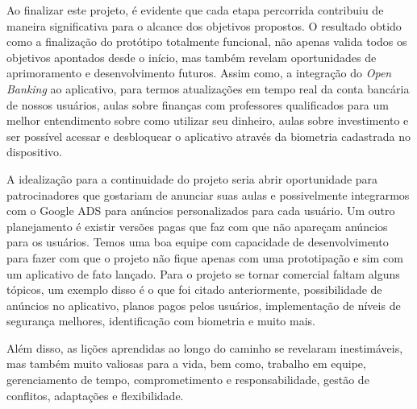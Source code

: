 Ao finalizar este projeto, é evidente que cada etapa percorrida contribuiu de maneira significativa para o alcance dos objetivos propostos. O resultado obtido como a finalização do protótipo totalmente funcional, não apenas valida todos os objetivos apontados desde o início, mas também revelam oportunidades de aprimoramento e desenvolvimento futuros. Assim como, a integração do \textit{Open Banking} ao aplicativo, para termos atualizações em tempo real da conta bancária de nossos usuários, aulas sobre finanças com professores qualificados para um melhor entendimento sobre como utilizar seu dinheiro, aulas sobre investimento e ser possível acessar e desbloquear o aplicativo através da biometria cadastrada no dispositivo.

A idealização para a continuidade do projeto seria abrir oportunidade para patrocinadores que gostariam de anunciar suas aulas e possivelmente integrarmos com o Google ADS para anúncios personalizados para cada usuário. Um outro planejamento é existir versões pagas que faz com que não apareçam anúncios para os usuários. Temos uma boa equipe com capacidade de desenvolvimento para fazer com que o projeto não fique apenas com uma prototipação e sim com um aplicativo de fato lançado. Para o projeto se tornar comercial faltam alguns tópicos, um exemplo disso é o que foi citado anteriormente, possibilidade de anúncios no aplicativo, planos pagos pelos usuários, implementação de níveis de segurança melhores, identificação com biometria e muito mais.

Além disso, as lições aprendidas ao longo do caminho se revelaram inestimáveis, mas também muito valiosas para a vida, bem como, trabalho em equipe, gerenciamento de tempo, comprometimento e responsabilidade, gestão de conflitos, adaptações e flexibilidade.